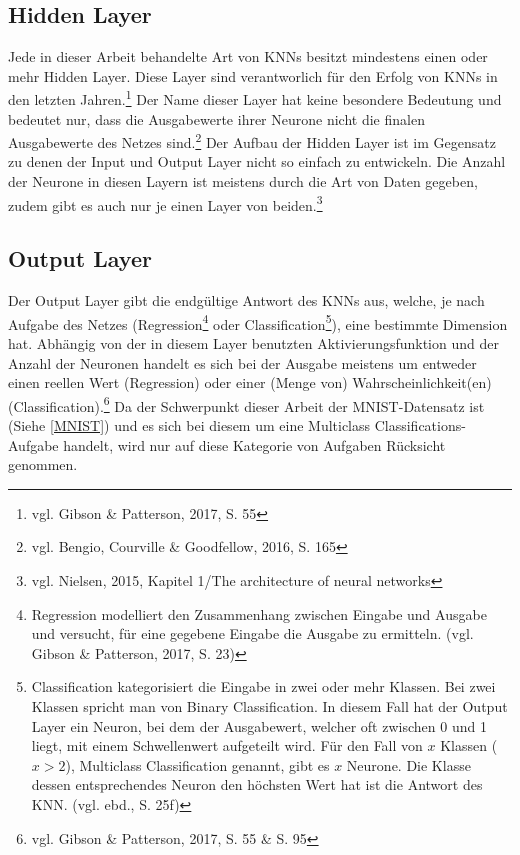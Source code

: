 \documentclass[
	a4paper,
	12pt,
	ngerman,
	oneside
]{scrreprt}											%
\begin{document}
			\subsection{Hidden Layer}
				Jede in dieser Arbeit behandelte Art von KNNs besitzt mindestens einen oder mehr Hidden Layer. Diese Layer sind verantworlich für den Erfolg von KNNs in den letzten Jahren.\footnote{vgl. Gibson \& Patterson, 2017, S. 55} Der Name dieser Layer hat keine besondere Bedeutung und bedeutet nur, dass die Ausgabewerte ihrer Neurone nicht die finalen Ausgabewerte des Netzes sind.\footnote{vgl. Bengio, Courville \& Goodfellow, 2016, S. 165} Der Aufbau der Hidden Layer ist im Gegensatz zu denen der Input und Output Layer nicht so einfach zu entwickeln. Die Anzahl der Neurone in diesen Layern ist meistens durch die Art von Daten gegeben, zudem gibt es auch nur je einen Layer von beiden.\footnote{vgl. Nielsen, 2015, Kapitel 1/The architecture of neural networks}
				
			\subsection{Output Layer}\label{OutputLayer}
				Der Output Layer gibt die endgültige Antwort des KNNs aus, welche, je nach Aufgabe des Netzes (Regression\footnote{Regression modelliert den Zusammenhang zwischen Eingabe und Ausgabe und versucht, für eine gegebene Eingabe die Ausgabe zu ermitteln. (vgl. Gibson \& Patterson, 2017, S. 23)} oder Classification\footnote{Classification kategorisiert die Eingabe in zwei oder mehr Klassen. Bei zwei Klassen spricht man von Binary Classification. In diesem Fall hat der Output Layer ein Neuron, bei dem der Ausgabewert, welcher oft zwischen 0 und 1 liegt, mit einem Schwellenwert aufgeteilt wird. Für den Fall von $x$ Klassen ($x > 2$), Multiclass Classification genannt, gibt es $x$ Neurone. Die Klasse dessen entsprechendes Neuron den höchsten Wert hat ist die Antwort des KNN. (vgl. ebd., S. 25f)}), eine bestimmte Dimension hat. Abhängig von der in diesem Layer benutzten Aktivierungsfunktion und der Anzahl der Neuronen handelt es sich bei der Ausgabe meistens um entweder einen reellen Wert (Regression) oder einer (Menge von) Wahrscheinlichkeit(en) (Classification).\footnote{vgl. Gibson \& Patterson, 2017, S. 55 \& S. 95} Da der Schwerpunkt dieser Arbeit der MNIST-Datensatz ist (Siehe \ref{MNIST}) und es sich bei diesem um eine Multiclass Classifications-Aufgabe handelt, wird nur auf diese Kategorie von Aufgaben Rücksicht genommen. 
		
		
\end{document}
